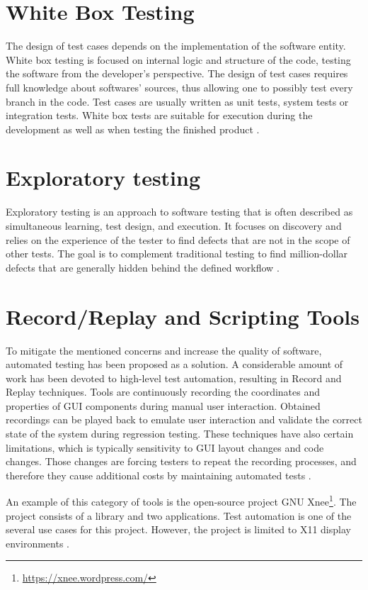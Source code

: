 \section{White Box Testing}
The design of test cases depends on the implementation of the software entity. White box testing is focused on internal logic and structure of the code, testing the software from the developer's perspective. The design of test cases requires full knowledge about softwares' sources, thus allowing one to possibly test every branch in the code. Test cases are usually written as unit tests, system tests or integration tests. White box tests are suitable for execution during the development as well as when testing the finished product \cite{white_black}.

\section{Exploratory testing}
Exploratory testing is an approach to software testing that is often described as simultaneous learning, test design, and execution. It focuses on discovery and relies on the experience of the tester to find defects that are not in the scope of other tests. The goal is to complement traditional testing to find million-dollar defects that are generally hidden behind the defined workflow \cite{exploratory_testing}.

\section{Record/Replay and Scripting Tools}\label{record_replay}
To mitigate the mentioned concerns and increase the quality of software, automated testing has been proposed as a solution. A considerable amount of work has been devoted to high-level test automation, resulting in Record and Replay techniques. Tools are continuously recording the coordinates and properties of GUI components during manual user interaction. Obtained recordings can be played back to emulate user interaction and validate the correct state of the system during regression testing. These techniques have also certain limitations, which is typically sensitivity to GUI layout changes and code changes. Those changes are forcing testers to repeat the recording processes, and therefore they cause additional costs by maintaining automated tests \cite{guitesting}. 

An example of this category of tools is the open-source project GNU Xnee\footnote{\url{https://xnee.wordpress.com/}}. The project consists of a library and two applications. Test automation is one of the several use cases for this project. However, the project is limited to X11 display environments \cite{xnee}.

